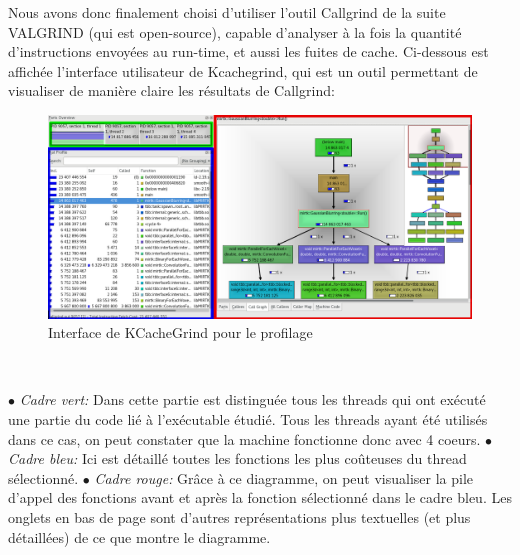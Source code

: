 \documentclass[10pt]{report}
\begin{document}
	Nous avons donc finalement choisi d'utiliser l'outil Callgrind de la suite VALGRIND (qui est open-source), capable d'analyser à la fois la quantité d'instructions envoyées au run-time, et aussi les fuites de cache.
	Ci-dessous est affichée l'interface utilisateur de Kcachegrind, qui est un outil permettant de visualiser de manière claire les résultats de Callgrind:
	\begin{figure}[h!]
		\begin{center}
			\includegraphics[width=13cm]{Reports/figures/UIkcachegrind.png}
		\end{center}	
		\caption{Interface de KCacheGrind pour le profilage}
		\label{Interface de KCacheGrind pour le profilage}
	\end{figure}~\par
	{$\bullet$} \textit{Cadre vert: } Dans cette partie est distinguée tous les threads qui ont exécuté une partie du code lié à l'exécutable étudié. Tous les threads ayant été utilisés dans ce cas, on peut constater que la machine fonctionne donc avec 4 coeurs. \newline
	{$\bullet$} \textit{Cadre bleu: } Ici est détaillé toutes les fonctions les plus coûteuses du thread sélectionné. \newline
	{$\bullet$} \textit{Cadre rouge: } Grâce à ce diagramme, on peut visualiser la pile d'appel des fonctions avant et après la fonction sélectionné dans le cadre bleu. Les onglets en bas de page sont d'autres représentations plus textuelles (et plus détaillées) de ce que montre le diagramme. \newline
	
	

	
\end{document}
